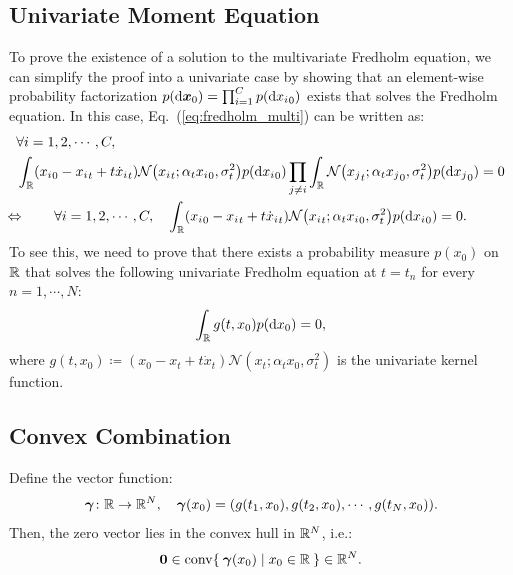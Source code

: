 \subsection{Univariate Moment Equation}
To prove the existence of a solution to the multivariate Fredholm equation, we can simplify the proof into a univariate case by showing that an element-wise probability factorization $p(\mathop{}\!\mathrm{d} {\bm{x}}_0) = \prod_{i=1}^C p(\mathop{}\!\mathrm{d} {x_i}_0)$ exists that solves the Fredholm equation. In this case, Eq.~(\ref{eq:fredholm_multi}) can be written as:
\begin{gather}
\begin{aligned}
   & \forall i = 1, 2, \cdots, C, \notag \\
   & \int_{\R} ({x_i}_0 - {x_i}_t + t{{}\dot{x}_i}_t) \mathcal{N}\left({x_i}_t; \alpha_t {x_i}_0, \sigma_t^2 \right) p(\diff {x_i}_0)  \prod_{j\neq i}\int_{\R}\mathcal{N}\left({x_j}_t; \alpha_t {x_j}_0, \sigma_t^2 \right) p(\diff {x_j}_0) = 0 \notag 
\end{aligned} \\
\begin{aligned}
   \equivto \forall i = 1, 2, \cdots, C,\quad \int_{\R} ({x_i}_0 - {x_i}_t + t{{}\dot{x}_i}_t) \mathcal{N}\left({x_i}_t; \alpha_t {x_i}_0, \sigma_t^2 \right) p(\diff {x_i}_0) = 0. 
\end{aligned}
\end{gather}
To see this, we need to prove that there exists a probability measure $p(x_0)$ on $\mathbb{R}$ that solves the following univariate Fredholm equation at $t = t_n$ for every $n=1,\cdots,N$:
\begin{align}
    \int_{\mathbb{R}} g(t,x_0) p(\mathop{}\!\mathrm{d} x_0) = 0,
\end{align}
where $g(t,x_0) \coloneqq (x_0 - x_t + t \dot{x}_t) \mathcal{N}\left(x_t; \alpha_t x_0, \sigma_t^2\right)$ is the univariate kernel function. 

\subsection{Convex Combination}
\begin{lemma}
Define the vector function:
\begin{equation}
    \vgamma \colon \R \to \R^{N}, \quad \vgamma(x_0) = \left( g(t_1, x_0), g(t_2, x_0),\cdots, g(t_N, x_0) \right).
\end{equation}
Then, the zero vector lies in the convex hull in $\mathbb{R}^N$, i.e.:
\begin{equation}
    \bm{0} \in \mathrm{conv} \Set{\vgamma(x_0) | x_0 \in \R} \in \R^N.
\end{equation}
\label{lem:convex}
\end{lemma}

